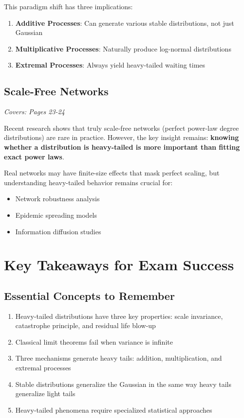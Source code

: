 \documentclass[11pt]{article}
\begin{document}
This paradigm shift has three implications:
\begin{enumerate}
    \item \textbf{Additive Processes}: Can generate various stable distributions, not just Gaussian
    \item \textbf{Multiplicative Processes}: Naturally produce log-normal distributions  
    \item \textbf{Extremal Processes}: Always yield heavy-tailed waiting times
\end{enumerate}

\subsection{Scale-Free Networks}
\textit{Covers: Pages 23-24}

Recent research shows that truly scale-free networks (perfect power-law degree distributions) are rare in practice. However, the key insight remains: \textbf{knowing whether a distribution is heavy-tailed is more important than fitting exact power laws}.

Real networks may have finite-size effects that mask perfect scaling, but understanding heavy-tailed behavior remains crucial for:
\begin{itemize}
    \item Network robustness analysis
    \item Epidemic spreading models  
    \item Information diffusion studies
\end{itemize}

\section{Key Takeaways for Exam Success}

\subsection{Essential Concepts to Remember}
\begin{enumerate}
    \item Heavy-tailed distributions have three key properties: scale invariance, catastrophe principle, and residual life blow-up
    \item Classical limit theorems fail when variance is infinite
    \item Three mechanisms generate heavy tails: addition, multiplication, and extremal processes
    \item Stable distributions generalize the Gaussian in the same way heavy tails generalize light tails
    \item Heavy-tailed phenomena require specialized statistical approaches
\end{enumerate}
\end{document}
